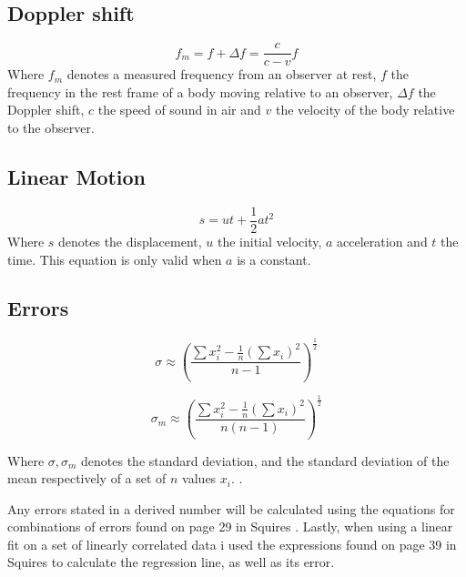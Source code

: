 \documentclass[11pt,a4paper]{article}
\begin{document}
  \subsection{Doppler shift}
    \begin{equation}
      f_m = f + \Delta f = \frac{c}{c-v}f  
      \label{eqn:doppler}
    \end{equation}
    Where $f_m$ denotes a measured frequency from an observer at rest, $f$ the frequency in the rest frame of a body moving relative to an observer, $\Delta f$ the Doppler shift, $c$ the speed of sound in air and $v$ the velocity of the body relative to the observer.

  \subsection{Linear Motion}
    \begin{equation}
      s = ut + \frac{1}{2}at^2
      \label{eqn:linmotion}
    \end{equation}
    Where $s$ denotes the displacement, $u$ the initial velocity, $a$ acceleration and $t$ the time. This equation is only valid when $a$ is a constant.

  \subsection{Errors}
    \begin{equation}
    \label{eqn:sigma}
      \sigma \approx \left(
      \frac{\sum x_i^2 - \frac{1}{n}(\sum x_i)^2}
      {n - 1}
      \right)^\frac{1}{2}
    \end{equation}
    
    \begin{equation}
      \label{eqn:sigma_m}
      \sigma_m \approx \left(
      \frac{\sum x_i^2 - \frac{1}{n}(\sum x_i)^2}
      {n(n - 1)}
      \right)^\frac{1}{2}
    \end{equation}

    Where $\sigma, \sigma_m$ denotes the standard deviation, and the standard deviation of the mean respectively of a set of $n$ values $x_i$. \cite{squires}.

    Any errors stated in a derived number will be calculated using the equations for combinations of errors found on page 29 in Squires \cite{squires}. Lastly, when using a linear fit on a set of linearly correlated data i used the expressions found on page 39 in Squires \cite{squires} to calculate the regression line, as well as its error.
\end{document}
